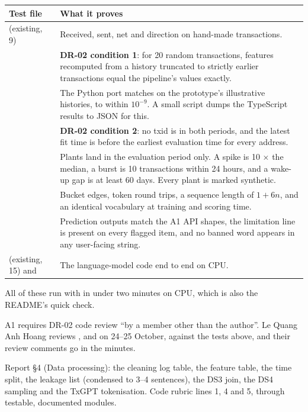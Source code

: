 \begin{center}
\small
\begin{tabularx}{\textwidth}{@{}L{4.6cm}Y@{}}
\toprule
\textbf{Test file} & \textbf{What it proves} \\
\midrule
{} (existing, 9) & Received, sent, net and direction on hand-made transactions. \\
 & \textbf{DR-02 condition 1}: for 20 random transactions, features recomputed from a history truncated to strictly earlier transactions equal the pipeline's values exactly. \\
 & The Python port matches  on the prototype's illustrative histories, to within $10^{-9}$. A small script dumps the TypeScript results to JSON for this. \\
 & \textbf{DR-02 condition 2}: no txid is in both periods, and the latest fit time is before the earliest evaluation time for every address. \\
 & Plants land in the evaluation period only. A spike is 10 × the median, a burst is 10 transactions within 24 hours, and a wake-up gap is at least 60 days. Every plant is marked synthetic. \\
 & Bucket edges, token round trips, a sequence length of $1+6n$, and an identical vocabulary at training and scoring time. \\
 & Prediction outputs match the A1 API shapes, the limitation line is present on every flagged item, and no banned word appears in any user-facing string. \\
 (existing, 15) and  & The language-model code end to end on CPU. \\
\bottomrule
\end{tabularx}
\end{center}

All of these run with  in under two minutes on CPU, which is also the
README's quick check.

\begin{team}
A1 requires DR-02 code review ``by a member other than the author''. Le Quang Anh Hoang reviews
,  and  on 24--25 October, against the tests
above, and their review comments go in the minutes.
\end{team}

\begin{feeds}
Report §4 (Data processing): the cleaning log table, the feature table, the time split, the
leakage list (condensed to 3--4 sentences), the DS3 join, the DS4 sampling and the TxGPT
tokenisation. Code rubric lines 1, 4 and 5, through testable, documented modules.
\end{feeds}
